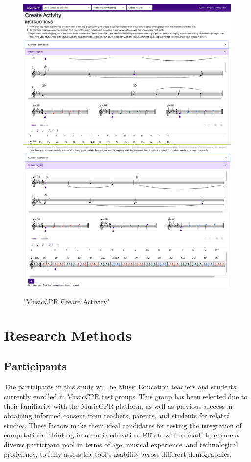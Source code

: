 \documentclass[manuscript,screen,review]{acmart}
\begin{document}
\begin{figure}
    \centering
    \includegraphics[width=1\linewidth]{proposal/Images/Create_One.png}
    \includegraphics[width=1\linewidth]{proposal/Images/Create_Two.png}
    \caption{"MusicCPR Create Activity"}
    \label{fig:enter-label}
\end{figure}

\section{Research Methods}


\subsection{Participants}
The participants in this study will be Music Education teachers and students currently enrolled in MusicCPR test groups. This group has been selected due to their familiarity with the MusicCPR platform, as well as previous success in obtaining informed consent from teachers, parents, and students for related studies. These factors make them ideal candidates for testing the integration of computational thinking into music education. Efforts will be made to ensure a diverse participant pool in terms of age, musical experience, and technological proficiency, to fully assess the tool’s usability across different demographics.
\end{document}
